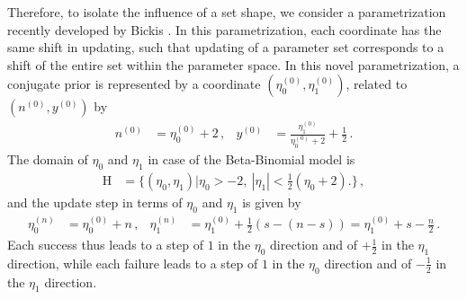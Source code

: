 \documentclass[runningheads,a4paper]{llncs}
\newcommand{\uz}{^{(0)}} %
\newcommand{\un}{^{(n)}} %
\def\yz{y\uz}
\def\nz{n\uz}
\def\Eta{\mathrm{H}}
\def\ezz{\eta_0\uz}
\def\eoz{\eta_1\uz}
\begin{document}
Therefore, to isolate the influence of a set shape,
we consider a parametrization recently developed by Bickis \cite{2015:mik-isipta}.
In this parametrization, each coordinate has the same shift in updating,
such that updating of a parameter set corresponds to a shift of the entire set within the parameter space.
In this novel parametrization, a conjugate prior is represented by a coordinate $(\ezz,\eoz)$,
related to $(\nz, \yz)$ by
\begin{align}
\label{eq:trafotony}
\nz &= \ezz + 2\,, &
\yz &= \frac{\eoz}{\ezz + 2} + \frac{1}{2}\,.
\end{align}
The domain of $\eta_0$ and $\eta_1$ in case of the Beta-Binomial model is
\begin{align}
\label{eq:eta-domain}
\Eta &= \Big\{ (\eta_0,\eta_1) \Big| \eta_0 > -2,\ |\eta_1| < \frac{1}{2}(\eta_0 + 2) \Big.\Big\}\,,
\end{align}
and the update step in terms of $\eta_0$ and $\eta_1$ is given by
\begin{equation}
\label{eq:eta-update}
\begin{aligned}
\eta_0\un &= \eta_0\uz + n\,, & 
\eta_1\un &= \eta_1\uz + \frac{1}{2}(s - (n-s)) = \eta_1\uz + s - \frac{n}{2}\,.
\end{aligned}
\end{equation}
Each success thus
leads to a step of $1$ in the $\eta_0$ direction and of $+\frac{1}{2}$ in the $\eta_1$ direction,
while each failure
leads to a step of $1$ in the $\eta_0$ direction and of $-\frac{1}{2}$ in the $\eta_1$ direction. %
\end{document}

